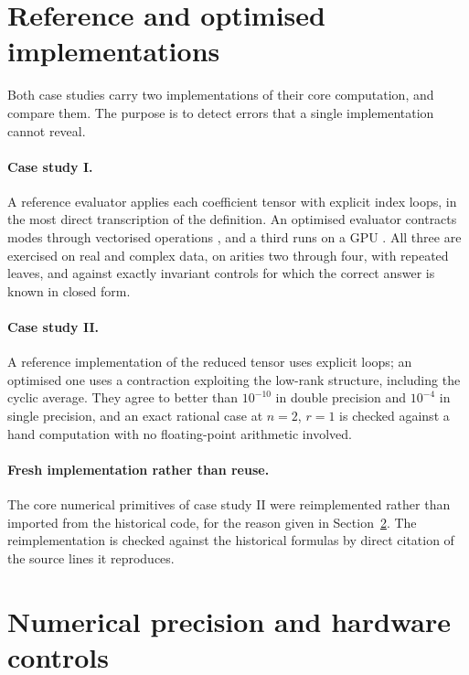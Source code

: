 \documentclass[11pt]{amsart}
\theoremstyle{remark}
\begin{document}
\section{Reference and optimised implementations}
\label{sec:implementations}

Both case studies carry two implementations of their core computation, and compare them.
The purpose is to detect errors that a single implementation cannot reveal.

\paragraph{Case study I.} A reference evaluator applies each coefficient tensor with
explicit index loops, in the most direct transcription of the definition. An optimised
evaluator contracts modes through vectorised operations \cite{HarrisEtAl2020}, and a third
runs on a GPU \cite{PaszkeEtAl2019}. All three are exercised on real and complex data, on
arities two through four, with repeated leaves, and against exactly invariant controls for
which the correct answer is known in closed form.

\paragraph{Case study II.} A reference implementation of the reduced tensor uses explicit
loops; an optimised one uses a contraction exploiting the low-rank structure, including the
cyclic average. They agree to better than $10^{-10}$ in double precision and $10^{-4}$ in
single precision, and an exact rational case at $n=2$, $r=1$ is checked against a hand
computation with no floating-point arithmetic involved.

\paragraph{Fresh implementation rather than reuse.} The core numerical primitives of case
study II were reimplemented rather than imported from the historical code, for the reason
given in Section~\ref{sec:precision}. The reimplementation is checked against the
historical formulas by direct citation of the source lines it reproduces.

\section{Numerical precision and hardware controls}
\label{sec:precision}
\end{document}
